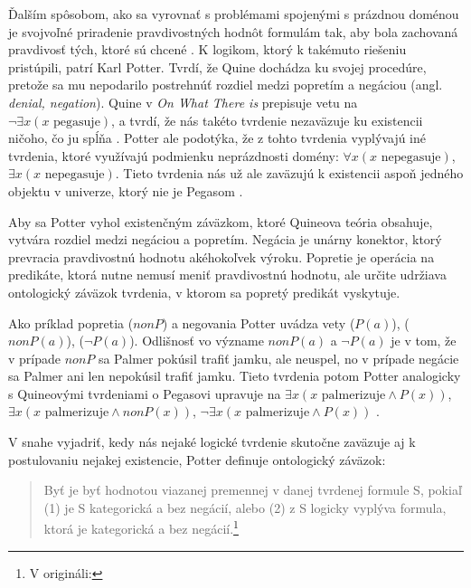 \documentclass[12pt, letterpaper]{article}
\begin{document}
Ďalším spôsobom, ako sa vyrovnať s problémami spojenými s prázdnou doménou je svojvoľné priradenie pravdivostných hodnôt formulám tak, aby bola zachovaná pravdivosť tých, ktoré sú chcené \parencites[352]{englebretsen}. K logikom, ktorý k takémuto riešeniu pristúpili, patrí Karl Potter. Tvrdí, že Quine dochádza ku svojej procedúre, pretože sa mu nepodarilo postrehnúť rozdiel medzi popretím a negáciou (angl. \textit{denial, negation}). Quine v \textit{On What There is} prepisuje vetu  na $\neg \exists x (x \text{ pegasuje})$, a tvrdí, že nás takéto tvrdenie nezaväzuje ku existencii ničoho, čo ju spĺňa \parencites[27]{quineThere}. Potter ale podotýka, že z tohto tvrdenia vyplývajú iné tvrdenia, ktoré využívajú podmienku neprázdnosti domény: $\forall x (x \text{ nepegasuje})$, $\exists x (x \text{ nepegasuje})$. Tieto tvrdenia nás už ale zaväzujú k existencii aspoň jedného objektu v univerze, ktorý nie je Pegasom \parencites[52]{potter}.\par
Aby sa Potter vyhol existenčným záväzkom, ktoré Quineova teória obsahuje, vytvára rozdiel medzi negáciou a popretím. Negácia je unárny konektor, ktorý prevracia pravdivostnú hodnotu akéhokoľvek výroku. Popretie je operácia na predikáte, ktorá nutne nemusí meniť pravdivostnú hodnotu, ale určite udržiava ontologický záväzok tvrdenia, v ktorom sa popretý predikát vyskytuje.\par
Ako príklad popretia ($nonP$) a negovania Potter uvádza vety  ($P(a)$),  ($nonP(a)$),  ($\neg P(a)$). Odlišnosť vo význame $nonP(a)$ a $\neg P(a)$ je v tom, že v prípade $nonP$ sa Palmer pokúsil trafiť jamku, ale neuspel, no v prípade negácie sa Palmer ani len nepokúsil trafiť jamku. Tieto tvrdenia potom Potter analogicky s Quineovými tvrdeniami o Pegasovi upravuje na $\exists x (x \text{ palmerizuje} \land P(x))$, $\exists x (x \text{ palmerizuje} \land nonP(x))$, $\neg \exists x (x \text{ palmerizuje} \land P(x))$ \parencites[350--351]{englebretsen}[53--54]{potter}.\par
V snahe vyjadriť, kedy nás nejaké logické tvrdenie skutočne zaväzuje aj k postulovaniu nejakej existencie, Potter definuje ontologický záväzok:
\begin{center}
\begin{quote}
Byť je byť hodnotou viazanej premennej v danej tvrdenej formule S, pokiaľ (1) je S kategorická a bez negácií, alebo (2) z S logicky vyplýva formula, ktorá je kategorická a bez negácií.\footnote{V origináli: }\parencite[vlastný preklad,][54]{potter}
\end{quote}
\end{center}
\end{document}

